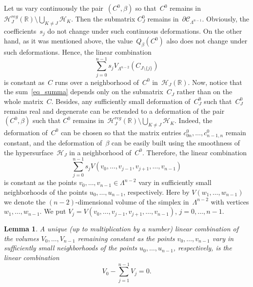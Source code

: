 \documentclass[reqno,tbtags,12pt]{amsart}
\numberwithin{equation}{section}
\newcommand{\R}{\mathbb{R}}
\newcommand{\CH}{\mathcal{H}}
\newcommand{\CC}{\mathcal{C}}
\newtheorem{lem}[theorem]{Lemma}
\theoremstyle{definition}
\begin{document}
Let us vary continuously the pair~$(C^0,\beta)$ so that~$C^0$ remains in~$\CH_J^{reg}(\R)\setminus\bigcup_{K\ne J}\CH_K$. Then the submatrix $C^0_J$ remains in~$\partial\CC_{\Lambda^{n-1}}$. Obviously, the coefficients~$s_j$ do not change under such continuous deformations. On the other hand, as it was mentioned above, the value~$Q_{\beta}(C^0)$ also does not change under such deformations. Hence, the linear combination
\begin{equation}\label{eq_summa}
\sum_{j=0}^{n-1}s_j V_{\Lambda^{n-2}}(C_{J\setminus\{j\}})
\end{equation}
is constant as~$C$ runs over a neighborhood of~$C^0$ in~$\CH_J(\R)$. Now, notice that the sum~\eqref{eq_summa} depends only on the submatrix~$C_J$ rather than on the whole matrix~$C$. Besides, any sufficiently small deformation of~$C_J^0$ such that~$C_J^0$ remains real and degenerate can be extended to a deformation of the pair~$(C^0,\beta)$ such that $C^0$ remains in~$\CH_J^{reg}(\R)\setminus\bigcup_{K\ne J}\CH_K$. Indeed, the deformation of~$C^0$ can be chosen so that the matrix entries $c^0_{0n},\ldots,c^0_{n-1,n}$ remain constant, and the deformation of~$\beta$ can be easily built using the smoothness of the hypersurface~$\CH_J$ in a neighborhood of~$C^0$. Therefore, the linear combination
\begin{equation}\label{eq_summa2}
\sum_{j=0}^{n-1}s_j V(v_0,\ldots,v_{j-1},v_{j+1},\ldots,v_{n-1})
\end{equation}
is constant as the points $v_0,\ldots,v_{n-1}\in\Lambda^{n-2}$ vary in sufficiently small neighborhoods of the points  $u_0,\ldots,u_{n-1}$, respectively. Here by $V(w_1,\ldots,w_{n-1})$ we denote the $(n-2)$-dimensional volume of the simplex in~$\Lambda^{n-2}$ with vertices $w_1,\ldots,w_{n-1}$. 
We put $V_j=V(v_0,\ldots,v_{j-1},v_{j+1},\ldots,v_{n-1})$, $j=0,\ldots,n-1$.

{\sloppy
\begin{lem}\label{lem_lin_comb}
A unique \textnormal{(}up to multiplication by a number\textnormal{)} linear combination of the volumes $V_0,\ldots,V_{n-1}$ remaining constant as the points $v_0,\ldots,v_{n-1}$ vary in sufficiently small neighborhoods of the points $u_0,\ldots,u_{n-1}$, respectively, is the linear combination
\begin{equation}\label{eq_lin_comb2}
V_0-\sum_{j=1}^{n-1}V_j=0.
\end{equation}
\end{lem}

}
\end{document}
